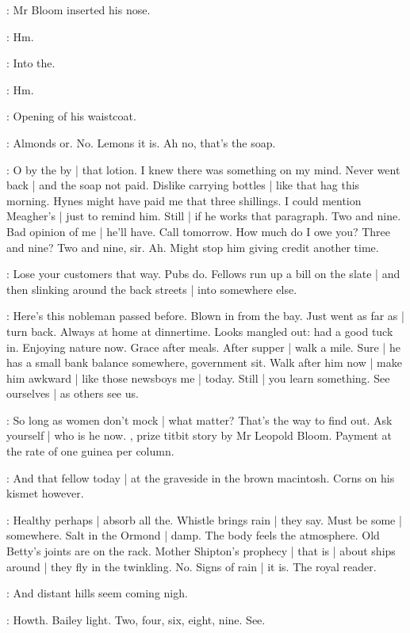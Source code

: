 :
Mr Bloom inserted his nose.

\BloomInt:
Hm.

:
Into the.

\BloomInt:
Hm.

:
Opening of his waistcoat.

\BloomCurrent:
Almonds or.
No.
Lemons
it is.
Ah no,
that's the soap.

\BloomToday:
O by the by |
that lotion.
I knew there was something on my mind.
Never went back |
and the soap not paid.
Dislike carrying bottles |
like that hag this morning.
Hynes might have paid me that three shillings.
I could mention Meagher's |
just to remind him.
Still |
if he works that paragraph.
Two and nine.
Bad opinion of me |
he'll have.
Call tomorrow.
How much do I owe you?
Three and nine?
Two and nine,
sir.
Ah.
Might stop him giving credit another time.

\BloomAbstract:
Lose your customers that way.%
Pubs do.
Fellows run up a bill on the slate |
and then slinking around the back streets |
into somewhere else.

\BloomCurrent:
Here's this nobleman passed before.
Blown in from the bay.
Just went as far as |
turn back.
Always at home at dinnertime.
Looks mangled out:
had a good tuck in.
Enjoying nature now.
Grace after meals.
After supper |
walk a mile.
Sure |
he has a small bank balance somewhere,
government sit.
Walk after him now |
make him awkward |
like those newsboys me |
today.
Still |
you learn something.
See ourselves |
as others see us.

\BloomAbstract:
So long as women don't mock |
what matter?
That's the way to find out.
Ask yourself |
who is he now.
,%
prize titbit story
by Mr Leopold Bloom.
Payment at the rate of one guinea per column.

\BloomToday:
And that fellow today |
at the graveside in the brown macintosh.
Corns on his kismet however.

\BloomAbstract:
Healthy perhaps |
absorb all the.
Whistle brings rain |
they say.
Must be some |
somewhere.
Salt in the Ormond |
damp.
The body feels the atmosphere.
Old Betty's joints are on the rack.
Mother Shipton's prophecy |
that is |
about ships around |
they fly in the twinkling.
No.
Signs of rain |
it is.
The royal reader.

\BloomCurrent:
And distant hills seem coming nigh.

\BloomCurrent:
Howth.
Bailey light.
Two,
four,
six,
eight,
nine.
See.

